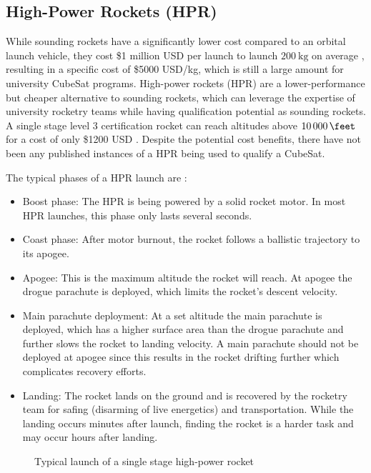 \documentclass{report}
\begin{document}
\subsection{High-Power Rockets (HPR)}
While sounding rockets have a significantly lower cost compared to an orbital launch vehicle, they cost \$1 million USD per launch to launch $\SI{200}{\kilo\gram}$ on average \cite{jurist2009commercial}, resulting in a specific cost of \$5000 USD/kg, which is still a large amount for university CubeSat programs. High-power rockets (HPR) are a lower-performance but cheaper alternative to sounding rockets, which can leverage the expertise of university rocketry teams while having qualification potential as sounding rockets. A single stage level 3 certification rocket can reach altitudes above $\SI{10000}{\feet}$ \cite{canepa2005modern} for a cost of only \$1200 USD \cite{canepa2005modern}. Despite the potential cost benefits, there have not been any published instances of a HPR being used to qualify a CubeSat.

The typical phases of a HPR launch are \cite{canepa2005modern}:

\begin{itemize}
  \item Boost phase: The HPR is being powered by a solid rocket motor. In most HPR launches, this phase only lasts several seconds.
  \item Coast phase: After motor burnout, the rocket follows a ballistic trajectory to its apogee.
  \item Apogee: This is the maximum altitude the rocket will reach. At apogee the drogue parachute is deployed, which limits the rocket's descent velocity.
  \item Main parachute deployment: At a set altitude the main parachute is deployed, which has a higher surface area than the drogue parachute and further slows the rocket to landing velocity. A main parachute should not be deployed at apogee since this results in the rocket drifting further which complicates recovery efforts.
  \item Landing: The rocket lands on the ground and is recovered by the rocketry team for safing (disarming of live energetics) and transportation. While the landing occurs minutes after launch, finding the rocket is a harder task and may occur hours after landing.
\end{itemize}

\begin{figure}[H]
  \centering
  
  \caption{Typical launch of a single stage high-power rocket}
  \label{fig:rocket_flight}
\end{figure}
\end{document}
